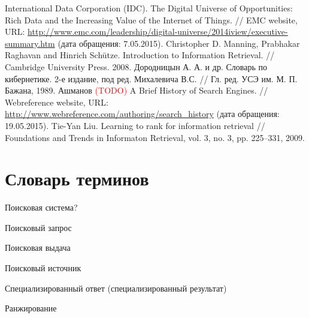 \documentclass[12pt,a4paper]{report}
\renewcommand{\bibname}{Список литературы}
\newcommand\note[1]{\textcolor{red}{(#1)}}
\begin{document}
\renewcommand{\bibname}{Список литературы}
\begin{thebibliography}{@}
  International Data Corporation (IDC). The Digital Universe of Opportunities: Rich Data and the Increasing Value of the Internet of Things. // EMC website,
  URL: \url{http://www.emc.com/leadership/digital-universe/2014iview/executive-summary.htm} (дата обращения: 7.05.2015).
  Christopher D. Manning, Prabhakar Raghavan and Hinrich Schütze. Introduction to Information Retrieval. // Cambridge University Press. 2008. %
  Дородницын А. А. и др. Словарь по кибернетике. 2-е издание, под ред. Михалевича В.С. // Гл. ред. УСЭ им. М. П. Бажана, 1989. %
  Ашманов \note{TODO}
  A Brief History of Search Engines. // Webreference website, 
  URL: \url{http://www.webreference.com/authoring/search_history} (дата обращения: 19.05.2015).
  Tie-Yan Liu. Learning to rank for information retrieval // Foundations and Trends in Informaton Retrieval, vol. 3, no. 3, pp. 225–331, 2009.
\end{thebibliography}

\chapter*{Словарь терминов}

Поисковая система?

Поисковый запрос

Поисковая выдача

Поисковый источник

Специализированный ответ (специализированный результат)

Ранжирование
\end{document}
